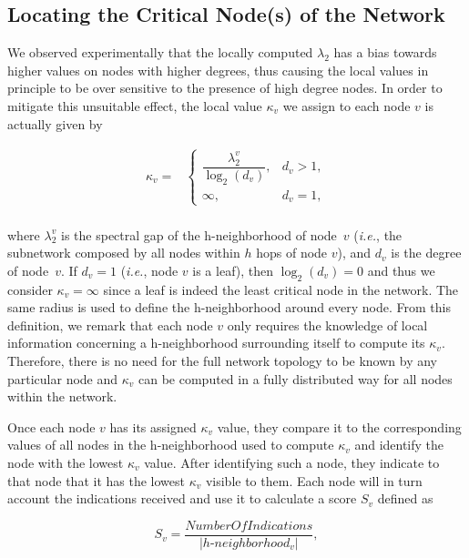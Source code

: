\documentclass[conference,fleqn]{IEEEtran}
\begin{document}
\subsection{Locating the Critical Node(s) of the Network}
\label{subsec:cri}

We observed experimentally that the locally computed $\lambda_2$ has a bias towards higher values on nodes with higher degrees, 
thus causing the local values in principle to be over sensitive to the presence of high degree nodes.
In order to mitigate this unsuitable effect, the local value $\kappa_v$ we assign to each node $v$ is actually given by

\begin{equation}
\begin{split}
	\kappa_v =&
	\begin{cases}
		\dfrac{\lambda^v_2}{\log_2(d_v)}, & d_v > 1,\\
		\infty, & d_v = 1,
	\end{cases}\\
\end{split}
\end{equation}

\noindent
where $\lambda^v_2$ is the spectral gap of the h-neighborhood of node~$v$ (\textit{i.e.},
the subnetwork composed by all nodes within $h$ hops of node $v$),
and $d_v$ 
is the degree of node~$v$. 
If $d_v = 1$ (\textit{i.e.}, node $v$ is a leaf), then $\log_2(d_v) = 0$ and thus we consider $\kappa_v = \infty$
since a leaf is indeed the least critical node in the network.
The same radius is used to define the h-neighborhood around every node.
From this definition, we remark that each node $v$ only requires the knowledge of local information
concerning a \mbox{h-neighborhood} surrounding itself  to compute its $\kappa_v$.
Therefore, there is no need for the full network
topology to be known by any particular node and $\kappa_v$ can be computed in a fully distributed way for all
nodes within the network.

Once each node $v$ has its assigned $\kappa_v$ value, they compare it to the corresponding values of all nodes
in the h-neighborhood used to compute $\kappa_v$ and identify the node with the lowest $\kappa_v$ value. After identifying such a node,
they indicate to that node that it has the lowest $\kappa_v$ visible to them. Each node will in turn account
the indications received and use it to calculate a score $S_v$ defined as

\begin{equation}
S_v = \frac{NumberOfIndications}{|h\text{-}neighborhood_v|},
\end{equation}
\end{document}
